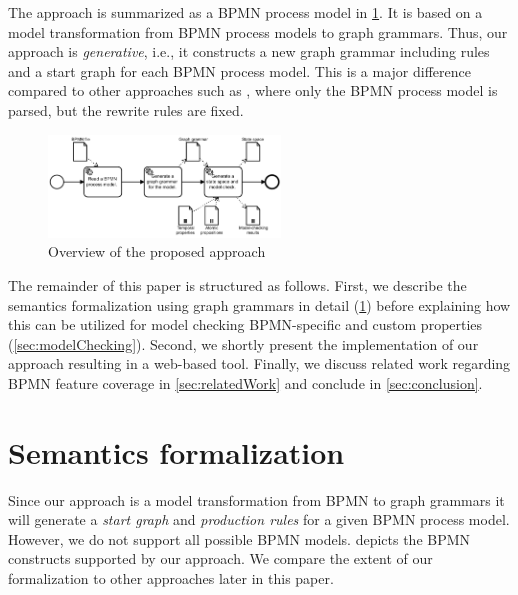 \documentclass[adraft, copyright, creativecommons]{eptcs} %
\begin{document}
The approach is summarized as a BPMN process model in \cref{fig:approach}.
It is based on a model transformation from BPMN process models to graph grammars.
Thus, our approach is \textit{generative}, i.e., it constructs a new graph grammar including rules and a start graph for each BPMN process model.
This is a major difference compared to other approaches such as \cite{corradiniFormalApproachAnalysis2021, vangorpVisualTokenbasedFormalization2013}, where only the BPMN process model is parsed, but the rewrite rules are fixed.

\begin{figure}[h]
    \centering
    \includegraphics[width=0.55\textwidth]{images/full-approach.pdf}
    \caption{Overview of the proposed approach}
    \label{fig:approach}
\end{figure}

The remainder of this paper is structured as follows.
First, we describe the semantics formalization using graph grammars in detail (\cref{sec:formalization}) before explaining how this can be utilized for model checking BPMN-specific and custom properties (\cref{sec:modelChecking}).
Second, we shortly present the implementation of our approach resulting in a web-based tool.
Finally, we discuss related work regarding BPMN feature coverage in \cref{sec:relatedWork} and conclude in \cref{sec:conclusion}.

\section{Semantics formalization} \label{sec:formalization}

Since our approach is a model transformation from BPMN to graph grammars it will generate a \emph{start graph} and \emph{production rules} for a given BPMN process model.
However, we do not support all possible BPMN models.
 depicts the BPMN constructs supported by our approach.
We compare the extent of our formalization to other approaches later in this paper.
\end{document}
